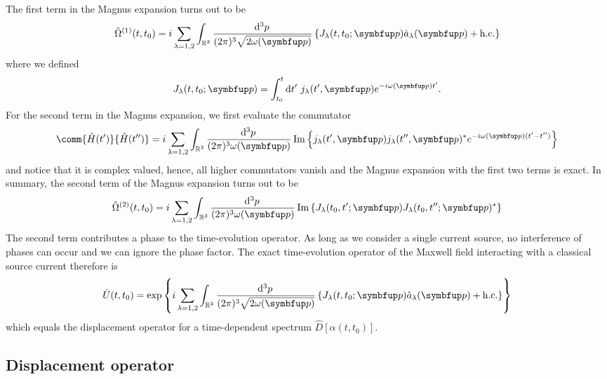 The first term in the Magnus expansion turns out to be
\begin{equation}
	\hat{\Omega}^{(1)}(t,t_0)
	=
	i
	\sum_{\lambda=1,2}
	\int_{\mathbb{R}^3}\frac{\dd[3]{p}}{(2\pi)^3\sqrt{2\omega(\vb{p})}}
	\left\{
		J_\lambda(t,t_0;\vb{p})
		\hat{a}_\lambda(\vb{p})
		+
		\text{h.c.}
	\right\}
\end{equation}
where we defined
\begin{equation}
	J_\lambda(t,t_0;\vb{p})
	=
	\int_{t_0}^t\dd{t^\prime}
	j_\lambda(t^\prime,\vb{p})
	e^{-i\omega(\vb{p})t^\prime}
	.
\end{equation}
For the second term in the Magnus expansion, we first evaluate the commutator
\begin{equation}
	\comm{\hat{H}(t^\prime)}{\hat{H}(t^{\prime\prime})}
	=
	i\sum_{\lambda=1,2}
	\int_{\mathbb{R}^3}\frac{\dd[3]{p}}{(2\pi)^3\omega(\vb{p})}
	\Im\left\{
		j_\lambda(t^\prime,\vb{p})
		j_\lambda(t^{\prime\prime},\vb{p})^*
		e^{-i\omega(\vb{p})(t^\prime-t^{\prime\prime})}
	\right\}
\end{equation}
and notice that it is complex valued, hence, all higher commutators vanish and the Magnus expansion with the first two terms is exact.
In summary, the second term of the Magnus expansion turns out to be
\begin{equation}
	\hat{\Omega}^{(2)}(t,t_0)
	=
	i\sum_{\lambda=1,2}
	\int_{\mathbb{R}^3}\frac{\dd[3]{p}}{(2\pi)^3\omega(\vb{p})}
	\Im\left\{
		J_\lambda(t_0,t^\prime;\vb{p})
		J_\lambda(t_0,t^{\prime\prime};\vb{p})^*
	\right\}
\end{equation}
The second term contributes a phase to the time-evolution operator.
As long as we consider a single current source, no interference of phases can occur and we can ignore the phase factor.
The exact time-evolution operator of the Maxwell field interacting with a classical source current therefore is
\begin{equation}
	\hat{U}(t,t_0)
	=
	\exp\left\{
		i\sum_{\lambda=1,2}
		\int_{\mathbb{R}^3}\frac{\dd[3]{p}}{(2\pi)^3\sqrt{2\omega(\vb{p})}}
		\left\{
			J_\lambda(t,t_0;\vb{p})
			\hat{a}_\lambda(\vb{p})
			+
			\text{h.c.}
		\right\}
	\right\}
\end{equation}
which equals the displacement operator for a time-dependent spectrum $\hat{D}[\alpha(t,t_0)]$.

\subsection{Displacement operator}